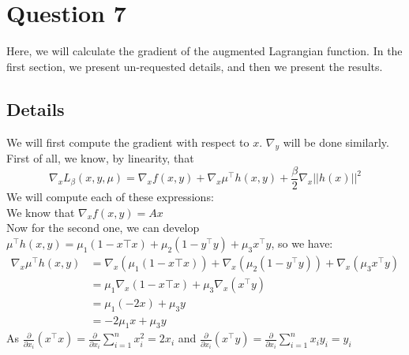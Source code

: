 \documentclass{article}
\newcommand{\R}{\mathbb{R}}
\newcommand{\tp}{^\top}
\newcommand{\p}{\frac{\partial}{\partial x_i}}
\begin{document}
\begin{comment}
So we may take $(x^*,  y^*) = (v_{\min }(A), v_{\min} (B))$, where $v_{\min }(A)$ and $v_{\min }(B)$ are the unit-normed eigenvectors of $\lambda_{\min}(A)$ and $\lambda_{\max}(B)$ respectively. \\
At this point, we need to recall that $(x^*,y^*)$ must belong to the set $S$, or equivalently we must have $h(x^*,y^*)=0$. By taking unit-normed eigenvectors, we ensure that $h_1(x^*,y^*)=0=h_2(x^*,y^*)$. The last condition is $h_3(x^*,y^*) = 0$. By definition of $h_3$, this means $(x^*)\tp y^* = 0$, i.e. $x^*$ and $y^*$ need to be orthogonal in $\R^n$. This is the only assumption we do not know, but observe that as soon as we know it the previous reasoning implies that the assumptions of the strong duality theorem are satisfied.\\

Hence, we can always find $\mu^*\in\R^3$ such that $(\text{A}2)$ is satisfied, but we cannot always ensure that $(\text{A}1)$ is satisfied. One condition that can ensure it however, is that the eigenvectors of $A$ and $B$ corresponding to their smallest eigenvalues are orthogonal. We can not expect to have this before solving the problem if we don't have specific informations about $A$ and $B$ other that them being symmetric.
\end{comment}



\section*{Question 7}
Here, we will calculate the gradient of the augmented Lagrangian function. In the first section, we present un-requested details, and then we present the results.
\subsection*{Details}

We will first compute the gradient with respect to $x$. $\nabla_y$ will be done similarly.\\
First of all, we know, by linearity, that 
$$\nabla_x L_{\beta}(x,y,\mu)=\nabla_x f(x,y) + \nabla_x \mu\tp h(x,y)+ \frac{\beta}{2} \nabla_x ||h(x)||^2$$
We will compute each of these expressions:\\

We know that $\nabla_x f(x,y)= Ax$\\

Now for the second one, we can develop $\mu\tp h(x,y)=\mu_1 (1-x\top x)+\mu_2(1-y\tp y) + \mu_3 x\tp y$, so we have:
\begin{align*}
\nabla_x \mu\tp h(x,y)&=\nabla_x (\mu_1 (1-x\top x))+\nabla_x (\mu_2(1-y\tp y)) +\nabla_x ( \mu_3 x\tp y)\\
&=\mu_1 \nabla_x (1-x\top x) + \mu_3 \nabla_x ( x\tp y)\\
&= \mu_1 (-2x) + \mu_3 y\\
&= - 2\mu_1 x+\mu_3 y
\end{align*}
As $\p(x\tp x)=\p \sum_{i=1}^n x_i^2=2x_i$ and  $\p(x\tp y)=\p \sum_{i=1}^n x_i y_i=y_i$\\
\end{document}
